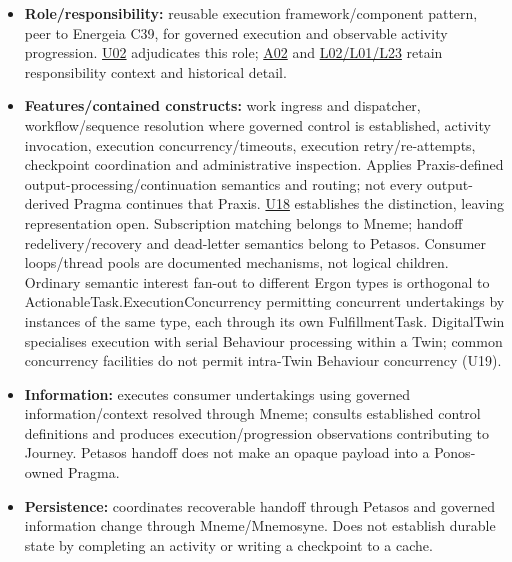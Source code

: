 \begin{itemize}


\item \textbf{Role/responsibility:} reusable execution framework/component pattern, peer
  to Energeia C39, for governed execution and observable activity progression.
  \href{\detokenize{../../../../../docs/markdown/05-information-systems-architecture/sources.md#u02}}{U02} adjudicates this role; \href{\detokenize{../../../../../docs/markdown/05-information-systems-architecture/sources.md#a02}}{A02} and
  \href{\detokenize{../../../../../docs/markdown/05-information-systems-architecture/sources.md#l02}}{L02/L01/L23} retain responsibility context and historical detail.

\item \textbf{Features/contained constructs:} work ingress and dispatcher, workflow/sequence
  resolution where governed control is established, activity invocation, execution
  concurrency/timeouts, execution retry/re-attempts, checkpoint coordination and
  administrative inspection. Applies Praxis-defined output-processing/continuation
  semantics and routing; not every output-derived Pragma continues that Praxis.
  \href{\detokenize{../../../../../docs/markdown/05-information-systems-architecture/sources.md#u18}}{U18} establishes the distinction, leaving representation open.
  Subscription matching belongs to Mneme; handoff
  redelivery/recovery and dead-letter semantics belong to Petasos.
  Consumer loops/thread pools are documented mechanisms, not logical children.
  Ordinary semantic interest fan-out to different Ergon types is orthogonal to
  ActionableTask.ExecutionConcurrency permitting concurrent undertakings by
  instances of the same type, each through its own FulfillmentTask. DigitalTwin
  specialises execution with serial Behaviour processing within a Twin; common
  concurrency facilities do not permit intra-Twin Behaviour concurrency (U19).

\item \textbf{Information:} executes consumer undertakings using governed information/context
  resolved through Mneme; consults established control definitions and produces
  execution/progression observations contributing to Journey. Petasos handoff
  does not make an opaque payload into a Ponos-owned Pragma.

\item \textbf{Persistence:} coordinates recoverable handoff through Petasos and governed
  information change through Mneme/Mnemosyne. Does not establish durable state
  by completing an activity or writing a checkpoint to a cache.


\end{itemize}
